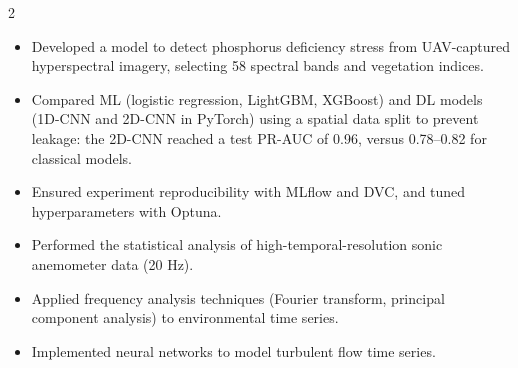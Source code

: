 \documentclass[10pt,a4paper,ragged2e,withhyper]{altacv}
\begin{document}
\begin{paracol}{2}





\begin{itemize}
\item Developed a model to detect phosphorus deficiency stress from UAV-captured hyperspectral imagery, selecting 58 spectral bands and vegetation indices.
\item Compared ML (logistic regression, LightGBM, XGBoost) and DL models (1D-CNN and 2D-CNN in PyTorch) using a spatial data split to prevent leakage: the 2D-CNN reached a test PR-AUC of 0.96, versus 0.78--0.82 for classical models.
\item Ensured experiment reproducibility with MLflow and DVC, and tuned hyperparameters with Optuna.
\end{itemize}

\divider


\begin{itemize}
\item Performed the statistical analysis of high-temporal-resolution sonic anemometer data (20 Hz).
\item Applied frequency analysis techniques (Fourier transform, principal component analysis) to environmental time series.
\item Implemented neural networks to model turbulent flow time series.
\end{itemize}




\end{paracol}
\end{document}
